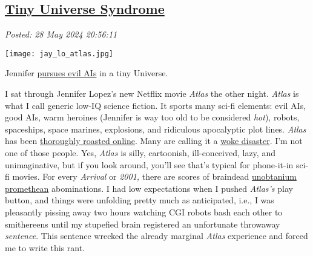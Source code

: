 %

\subsection*{\href{http://analyzethedatanotthedrivel.org/2024/05/28/tiny-universe-syndrome/}{Tiny Universe Syndrome}}


\noindent\emph{Posted: 28 May 2024 20:56:11}
\vspace{6pt}



\captionsetup[floatingfigure]{labelformat=empty}
 \begin{floatingfigure}[r]{0.27\textwidth}
 \centering
 \texttt{[image: jay\_lo\_atlas.jpg]}
 \caption{Jennifer \href{https://www.imdb.com/title/tt14856980/}{pursues evil AIs} in a tiny Universe.}
 \label{fig:8170x0}
 \end{floatingfigure} I sat through Jennifer Lopez's new Netflix movie \emph{Atlas} the other
night. \emph{Atlas} is what I call generic low-IQ science fiction. It
sports many sci-fi elements: evil AIs, good AIs, warm heroines (Jennifer
is way too old to be considered \emph{hot}), robots, spaceships, space
marines, explosions, and ridiculous apocalyptic plot lines. \emph{Atlas}
has been \href{https://www.rottentomatoes.com/m/atlas_2024}{thoroughly
roasted online}. Many are calling it a
\href{https://www.msn.com/en-us/money/news/you-re-about-to-get-a-sale-on-nvidia-jim-cramer-shares-insight-on-buying-during-pullbacks/ar-BB1n9fmx}{woke
disaster}. I'm not one of those people. Yes, \emph{Atlas} is silly,
cartoonish, ill-conceived, lazy, and unimaginative, but if you look
around, you'll see that's typical for phone-it-in sci-fi movies. For
every \emph{Arrival} or \emph{2001,} there are scores of braindead
\href{https://james-camerons-avatar.fandom.com/wiki/Unobtanium}{unobtanium}
\href{https://www.rottentomatoes.com/m/prometheus_2012}{promethean}
abominations. I had low expectations when I pushed \emph{Atlas's} play
button, and things were unfolding pretty much as anticipated, i.e., I
was pleasantly pissing away two hours watching CGI robots bash each
other to smithereens until my stupefied brain registered an unfortunate
throwaway \emph{sentence}. This sentence wrecked the already marginal
\emph{Atlas} experience and forced me to write this rant.

